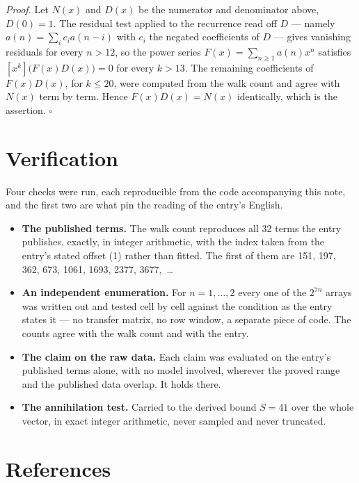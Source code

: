 \documentclass[11pt]{article}
\theoremstyle{definition}
\begin{document}
{\itshape Proof.} Let $N(x)$ and $D(x)$ be the numerator and denominator above, $D(0)=1$. The residual test applied to the recurrence read off $D$ --- namely $a(n) = \sum_i c_i a(n-i)$ with $c_i$ the negated coefficients of $D$ --- gives vanishing residuals for every $n > 12$, so the power series $F(x)=\sum_{n\ge 1}a(n)x^n$ satisfies $[x^k]\bigl(F(x)D(x)\bigr) = 0$ for every $k > 13$. The remaining coefficients of $F(x)D(x)$, for $k \le 20$, were computed from the walk count and agree with $N(x)$ term by term. Hence $F(x)D(x) = N(x)$ identically, which is the assertion. $\square$

\section{Verification}

Four checks were run, each reproducible from the code accompanying this note, and the first two are what pin the reading of the entry's English.

\begin{itemize}

\item {\bfseries The published terms.} The walk count reproduces all 32 terms the entry publishes, exactly, in integer arithmetic, with the index taken from the entry's stated offset (1) rather than fitted. The first of them are 151, 197, 362, 673, 1061, 1693, 2377, 3677,~\dots

\item {\bfseries An independent enumeration.} For $n = 1,\dots,2$ every one of the $2^{7n}$ arrays was written out and tested cell by cell against the condition as the entry states it --- no transfer matrix, no row window, a separate piece of code. The counts agree with the walk count and with the entry.

\item {\bfseries The claim on the raw data.} Each claim was evaluated on the entry's published terms alone, with no model involved, wherever the proved range and the published data overlap. It holds there.

\item {\bfseries The annihilation test.} Carried to the derived bound $S = 41$ over the whole vector, in exact integer arithmetic, never sampled and never truncated.

\end{itemize}

\section{References}
\end{document}
